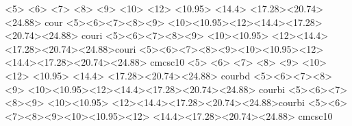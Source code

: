    {  <5> <6> <7> <8> <9> <10> <12> 
      <10.95> 
      <14.4>  
      <17.28><20.74><24.88> cour}{}
    {
      <5><6><7><8><9>
      <10><10.95><12><14.4><17.28><20.74><24.88> couri%
      }{}
    {
      <5><6><7><8><9>
      <10><10.95>
      <12><14.4><17.28><20.74><24.88>couri%
      }{}
    {
      <5><6><7><8><9><10><10.95><12>
      <14.4><17.28><20.74><24.88> cmcsc10
      }{}
   {  <5> <6> <7> <8> <9> <10> <12> 
      <10.95> 
      <14.4>  
      <17.28><20.74><24.88> courbd}{}
    {
      <5><6><7><8><9>
      <10><10.95><12><14.4><17.28><20.74><24.88> courbi%
      }{}
    {
      <5><6><7><8><9>
      <10><10.95>
      <12><14.4><17.28><20.74><24.88>courbi%
      }{}
    {
      <5><6><7><8><9><10><10.95><12>
      <14.4><17.28><20.74><24.88> cmcsc10
      }{}

\renewcommand{\familydefault}{ntr}
\renewcommand{\rmdefault}{ntr}
\renewcommand{\sfdefault}{ari}
\renewcommand{\ttdefault}{cou}


\endinput
